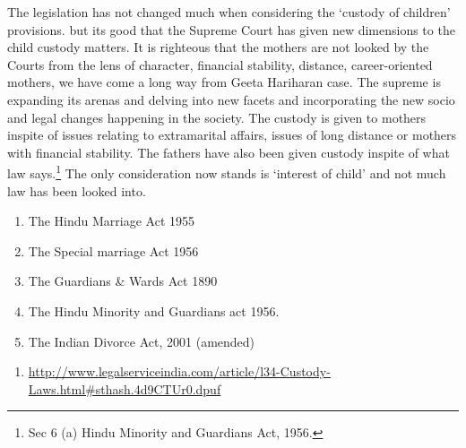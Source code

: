\begin{multicols}{2}
\noi
The legislation has not changed much when considering the ‘custody of children’ provisions. but
its good that the Supreme Court has given new dimensions to the child custody matters. It is
righteous that the mothers are not looked by the Courts from the lens of character, financial
stability, distance, career-oriented mothers, we have come a long way from Geeta Hariharan case.
The supreme is expanding its arenas and delving into new facets and incorporating the new socio
and legal changes happening in the society. The custody is given to mothers inspite of issues
relating to extramarital affairs, issues of long distance or mothers with financial stability. The
fathers have also been given custody inspite of what law says.\footnote{Sec 6 (a) Hindu Minority and Guardians Act, 1956.} The only consideration now stands is ‘interest of child’ and not much law has been looked into.


\vspace{-.3cm}

\begin{enumerate}

\itemsep=0pt

\item The Hindu Marriage Act 1955

\item The Special marriage Act 1956

\item The Guardians \& Wards Act 1890

\item The Hindu Minority and Guardians act 1956.

\item The Indian Divorce Act, 2001 (amended) 
\end{enumerate}

\vspace{-.3cm}


\vspace{-.3cm}

\begin{enumerate}
\item \url{http://www.legalserviceindia.com/article/l34-Custody-Laws.html#sthash.4d9CTUr0.dpuf}
\end{enumerate}
\end{multicols}
\label{end2018-art3}
